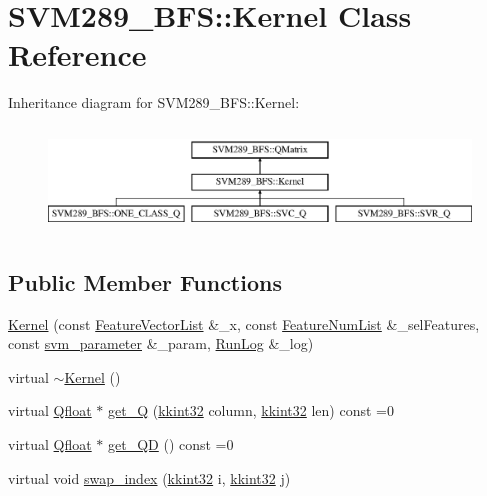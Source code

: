 \hypertarget{class_s_v_m289___b_f_s_1_1_kernel}{}\section{S\+V\+M289\+\_\+\+B\+FS\+:\+:Kernel Class Reference}
\label{class_s_v_m289___b_f_s_1_1_kernel}
Inheritance diagram for S\+V\+M289\+\_\+\+B\+FS\+:\+:Kernel\+:\begin{figure}[H]
\begin{center}
\leavevmode
\includegraphics[height=2.828283cm]{class_s_v_m289___b_f_s_1_1_kernel}
\end{center}
\end{figure}
\subsection*{Public Member Functions}
\begin{DoxyCompactItemize}
\item 
\hyperlink{class_s_v_m289___b_f_s_1_1_kernel_add18840e1716a1f32e291de3096ae560}{Kernel} (const \hyperlink{class_k_k_m_l_l_1_1_feature_vector_list}{Feature\+Vector\+List} \&\+\_\+x, const \hyperlink{class_k_k_m_l_l_1_1_feature_num_list}{Feature\+Num\+List} \&\+\_\+sel\+Features, const \hyperlink{struct_s_v_m289___b_f_s_1_1svm__parameter}{svm\+\_\+parameter} \&\+\_\+param, \hyperlink{class_k_k_b_1_1_run_log}{Run\+Log} \&\+\_\+log)
\item 
virtual \hyperlink{class_s_v_m289___b_f_s_1_1_kernel_a888c0813c87096b4de12f5387c428d6f}{$\sim$\+Kernel} ()
\item 
virtual \hyperlink{namespace_s_v_m289___b_f_s_a8b0a7657dcefcb6e9a857c9b5e2fd2ef}{Qfloat} $\ast$ \hyperlink{class_s_v_m289___b_f_s_1_1_kernel_a8bed33493f8e35c6a93b7945f3e3bd19}{get\+\_\+Q} (\hyperlink{namespace_k_k_b_a8fa4952cc84fda1de4bec1fbdd8d5b1b}{kkint32} column, \hyperlink{namespace_k_k_b_a8fa4952cc84fda1de4bec1fbdd8d5b1b}{kkint32} len) const  =0
\item 
virtual \hyperlink{namespace_s_v_m289___b_f_s_a8b0a7657dcefcb6e9a857c9b5e2fd2ef}{Qfloat} $\ast$ \hyperlink{class_s_v_m289___b_f_s_1_1_kernel_a8b5e82405c791e60243be855b76a26fc}{get\+\_\+\+QD} () const  =0
\item 
virtual void \hyperlink{class_s_v_m289___b_f_s_1_1_kernel_a40e0edd7d2e5f3faef5a6c31f05ca1b2}{swap\+\_\+index} (\hyperlink{namespace_k_k_b_a8fa4952cc84fda1de4bec1fbdd8d5b1b}{kkint32} i, \hyperlink{namespace_k_k_b_a8fa4952cc84fda1de4bec1fbdd8d5b1b}{kkint32} j)
\end{DoxyCompactItemize}
